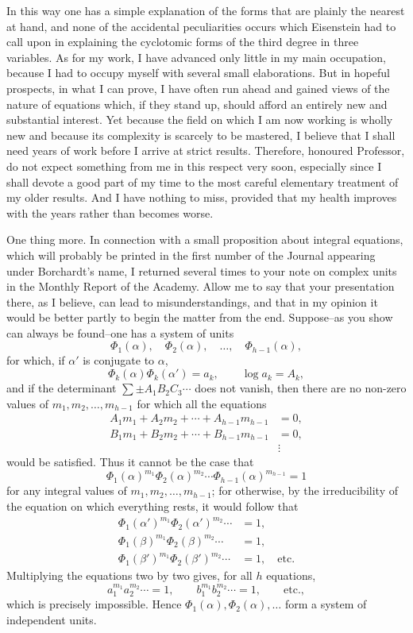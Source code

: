 \documentclass[11pt]{article}
\begin{document}
In this way one has a simple explanation of the forms that are plainly the nearest at hand, and none of the accidental peculiarities occurs which Eisenstein had to call upon in explaining the cyclotomic forms of the third degree in three variables. As for my work, I have advanced only little in my main occupation, because I had to occupy myself with several small elaborations. But in hopeful prospects, in what I can prove, I have often run ahead and gained views of the nature of equations which, if they stand up, should afford an entirely new and substantial interest. Yet because the field on which I am now working is wholly new and because its complexity is scarcely to be mastered, I believe that I shall need years of work before I arrive at strict results. Therefore, honoured Professor, do not expect something from me in this respect very soon, especially since I shall devote a good part of my time to the most careful elementary treatment of my older results. And I have nothing to miss, provided that my health improves with the years rather than becomes worse.

One thing more. In connection with a small proposition about integral equations, which will probably be printed in the first number of the Journal appearing under Borchardt's name, I returned several times to your note on complex units in the Monthly Report of the Academy. Allow me to say that your presentation there, as I believe, can lead to misunderstandings, and that in my opinion it would be better partly to begin the matter from the end. Suppose--as you show can always be found--one has a system of units
\[
  \Phi_1(\alpha),\quad \Phi_2(\alpha),\quad \ldots,\quad \Phi_{h-1}(\alpha),
\]
for which, if $\alpha'$ is conjugate to $\alpha$,
\[
  \Phi_k(\alpha)\Phi_k(\alpha')=a_k,\qquad \log a_k=A_k,
\]
and if the determinant $\sum \pm A_1B_2C_3\cdots$ does not vanish, then there are no non-zero values of $m_1,m_2,\ldots,m_{h-1}$ for which all the equations
\[
\begin{aligned}
A_1m_1+A_2m_2+\cdots+A_{h-1}m_{h-1}&=0,\\
B_1m_1+B_2m_2+\cdots+B_{h-1}m_{h-1}&=0,\\
&\vdots
\end{aligned}
\]
would be satisfied. Thus it cannot be the case that
\[
  \Phi_1(\alpha)^{m_1}\Phi_2(\alpha)^{m_2}\cdots\Phi_{h-1}(\alpha)^{m_{h-1}}=1
\]
for any integral values of $m_1,m_2,\ldots,m_{h-1}$; for otherwise, by the irreducibility of the equation on which everything rests, it would follow that
\[
\begin{aligned}
\Phi_1(\alpha')^{m_1}\Phi_2(\alpha')^{m_2}\cdots&=1,\\
\Phi_1(\beta)^{m_1}\Phi_2(\beta)^{m_2}\cdots&=1,\\
\Phi_1(\beta')^{m_1}\Phi_2(\beta')^{m_2}\cdots&=1,\quad\text{etc.}
\end{aligned}
\]
Multiplying the equations two by two gives, for all $h$ equations,
\[
  a_1^{m_1}a_2^{m_2}\cdots=1,
  \qquad
  b_1^{m_1}b_2^{m_2}\cdots=1,
  \qquad\text{etc.},
\]
which is precisely impossible. Hence $\Phi_1(\alpha),\Phi_2(\alpha),\ldots$ form a system of independent units.
\end{document}
